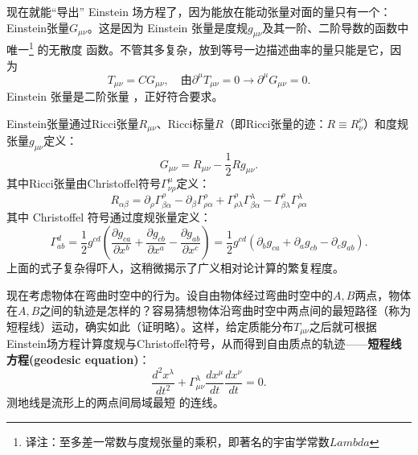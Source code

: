 
现在就能“导出” Einstein 场方程了，因为能放在能动张量对面的量只有一个：Einstein张量$G_{\mu \nu}$。这是因为 Einstein 张量是度规$g_{\mu \nu}$及其一阶、二阶导数的函数中唯一\footnote{译注：至多差一常数与度规张量的乘积，即著名的宇宙学常数$Lambda$} 的无散度%
%
函数。不管其多复杂，放到等号一边描述曲率的量只能是它，因为
\begin{equation}
\label{equ12.3}
    T_{\mu \nu} = C G_{\mu \nu}, \quad \text{由} \partial^\mu T_{\mu \nu} = 0 \to \partial^\mu G_{\mu \nu} = 0.
\end{equation}
Einstein 张量是二阶张量%
%
，正好符合要求。

Einstein张量通过Ricci张量$R_{\mu \nu}$、Ricci标量$R$（即Ricci张量的迹：$R \equiv R^\nu_\nu$）和度规张量$g_{\mu \nu}$定义：
\begin{equation}
\label{equ12.4}
    G_{\mu \nu} = R_{\mu \nu} - \frac{1}{2} R g_{\mu \nu}.
\end{equation}
其中Ricci张量由Christoffel符号$\Gamma^\mu_{\nu \rho}$定义：
\begin{equation}
\label{equ12.5}
    R_{\alpha \beta} = \partial_\rho \Gamma^\rho_{\beta \alpha} - \partial_\beta \Gamma^\rho_{\rho \alpha} + \Gamma^\rho_{\rho \lambda} \Gamma^\lambda_{\beta \alpha} - \Gamma^\rho_{\beta \lambda} \Gamma^\lambda_{\rho \alpha}
\end{equation}
其中 Christoffel 符号通过度规张量定义：
\begin{equation}
\label{equ12.6}
    \Gamma^d_{ab} = \frac{1}{2} g^{cd} \left( \frac{\partial g_{ca}}{\partial x^b} + \frac{\partial g_{cb}}{\partial x^a} - \frac{\partial g_{ab}}{\partial x^c} \right) = \frac{1}{2} g^{cd} (\partial_b g_{ca} + \partial_a g_{cb} - \partial_c g_{ab}).
\end{equation}
上面的式子复杂得吓人，这稍微揭示了广义相对论计算的繁复程度。

现在考虑物体在弯曲时空中的行为。设自由物体经过弯曲时空中的$A, B$两点，物体在$A, B$之间的轨迹是怎样的？容易猜想物体沿弯曲时空中两点间的最短路径（称为短程线）运动，确实如此（证明略）。这样，给定质能分布$T_{\mu \nu}$之后就可根据Einstein场方程计算度规与Christoffel符号，从而得到自由质点的轨迹——{\bf 短程线方程(geodesic equation)}：
\begin{equation}
\label{equ12.7}
    \frac{d^2 x^\lambda}{dt^2} + \Gamma^\lambda_{\mu \nu} \frac{d x^\mu}{dt} \frac{d x^\nu}{dt} = 0.
\end{equation}
测地线是流形上的两点间局域最短%
%
的连线。

